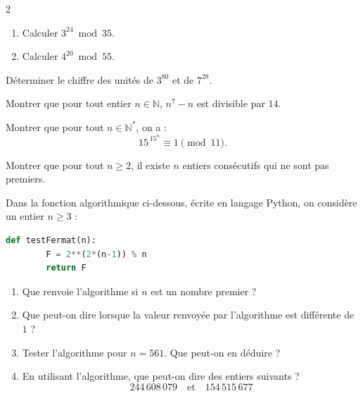 \documentclass[a4paper,12pt]{article}
\newcommand{\footnotettfamily}{\ttfamily\footnotesize}
\begin{document}
\begin{multicols}{2}
\begin{exercice}[title=Exercice 19 $\star\star$ { [Calculer] }]{}{}
  \begin{enumerate}
    \item Calculer $3^{24} \bmod 35$.
    \item Calculer $4^{20} \bmod 55$.
  \end{enumerate}
\end{exercice}

\begin{exercice}[title=Exercice 20 $\star\star$ { [Calculer] }]{}{}
  Déterminer le chiffre des unités de $3^{80}$ et de $7^{28}$.
\end{exercice}

\begin{exercice}[title=Exercice 21 $\star\star$ { [Calculer, Chercher] }]{}{}
  Montrer que pour tout entier $n \in \mathbb{N}$, $n^7 - n$ est divisible par $14$.
\end{exercice}

\begin{exercice}[title=Exercice 22 $\star\star\star$ { [Calculer] }]{}{}
  Montrer que pour tout $n \in \mathbb{N}^*$, on a :
  \[
    15^{\,15^n} \equiv 1 \pmod{11}.
  \]
\end{exercice}

\begin{exercice}[title=Exercice 23 $\star\star\star$ { [Chercher] }]{}{}
  Montrer que pour tout $n \ge 2$, il existe $n$ entiers consécutifs qui ne sont pas premiers.
\end{exercice}

\begin{exercice}[title=Exercice 24 $\star$ { [Représenter, Raisonner] }]{}{}
  Dans la fonction algorithmique ci-dessous, écrite en langage Python, on considère un entier $n \ge 3$ :

    \begin{lstlisting}[language=Python, basicstyle=\footnotettfamily]
    def testFermat(n):
        F = 2**(2*(n-1)) % n
        return F
    \end{lstlisting}

  \begin{enumerate}
    \item Que renvoie l'algorithme si $n$ est un nombre premier ?
    \item Que peut-on dire lorsque la valeur renvoyée par l'algorithme est différente de $1$ ?
    \item Tester l'algorithme pour $n = 561$. Que peut-on en déduire ?
    \item En utilisant l'algorithme, que peut-on dire des entiers suivants ?
      \[
        244\,608\,079
        \quad\text{et}\quad
        154\,515\,677
      \]
  \end{enumerate}
\end{exercice}


\end{multicols}
\end{document}
